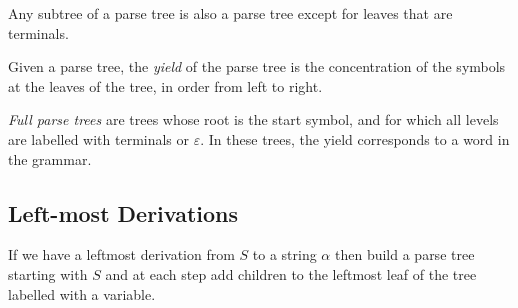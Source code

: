 \documentclass[12pt]{article}
\begin{document}
Any subtree of a parse tree is also a parse tree except for leaves that are
terminals.

Given a parse tree, the \emph{yield} of the parse tree is the concentration of
the symbols at the leaves of the tree, in order from left to right.

\emph{Full parse trees} are trees whose root is the start symbol, and for which
all levels are labelled with terminals or $\varepsilon$.  In these trees, the
yield  corresponds to a word in the grammar.

\subsection{Left-most Derivations}

If we have a leftmost derivation from $S$ to a string $\alpha$ then build a
parse tree starting with $S$ and at each step add children to the leftmost leaf
of the tree labelled with a variable.
\end{document}
